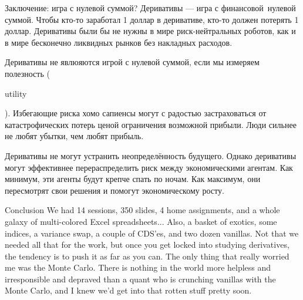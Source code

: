 \documentclass{beamer}
\newcommand{\en}[1]{\begin{otherlanguage}{english}#1\end{otherlanguage}}
\begin{document}
\begin{frame}{Заключение: игра с нулевой суммой?}
\justify
Деривативы --- игра с \alert{финансовой}\ нулевой суммой. Чтобы кто-то заработал 1 доллар в деривативе, кто-то должен потерять 1 доллар. Деривативы были бы не нужны в мире риск-нейтральных роботов, как и в мире бесконечно ликвидных рынков без накладных расходов.

\justify
Деривативы не явлюяются игрой с нулевой суммой, если мы измеряем \alert{полезность} (\en{utility}). Избегающие риска хомо сапиенсы могут с радостью застраховаться от катастрофических потерь ценой ограничения возможной прибыли. Люди сильнее не любят убытки, чем любят прибыль.

\justify
Деривативы не могут устранить неопределённость будущего. Однако деривативы могут эффективнее перераспределить риск между экономическими агентам. Как минимум, эти агенты будут крепче спать по ночам. Как максимум, они пересмотрят свои решения и помогут экономическому росту.
\end{frame}



\begin{frame}{Conclusion}
\justify
We had 14 sessions, 350 slides, 4 home assignments, and a whole galaxy of multi-colored Excel spreadsheets... Also, a basket of exotics, some indices, a variance swap, a couple of CDS'es, and two dozen vanillas. Not that we needed all that for the work, but once you get locked into studying derivatives, the tendency is to push it as far as you can. The only thing that really worried me was the Monte Carlo. There is nothing in the world more helpless and irresponsible and depraved than a quant who is crunching vanillas with the Monte Carlo, and I knew we'd get into that rotten stuff pretty soon.
\end{frame}
\end{document}
